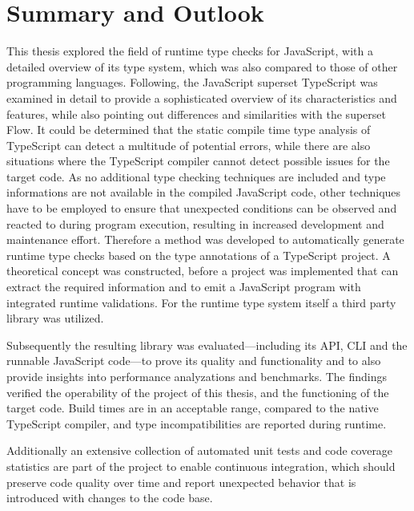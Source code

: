 \chapter{Summary and Outlook}
\label{cha:summary_outlook}

This thesis explored the field of runtime type checks for JavaScript, with a detailed overview of its type system, which was also compared to those of other programming languages. Following, the JavaScript superset TypeScript was examined in detail to provide a sophisticated overview of its characteristics and features, while also pointing out differences and similarities with the superset Flow. It could be determined that the static compile time type analysis of TypeScript can detect a multitude of potential errors, while there are also situations where the TypeScript compiler cannot detect possible issues for the target code. As no additional type checking techniques are included and type informations are not available in the compiled JavaScript code, other techniques have to be employed to ensure that unexpected conditions can be observed and reacted to during program execution, resulting in increased development and maintenance effort. Therefore a method was developed to automatically generate runtime type checks based on the type annotations of a TypeScript project. A theoretical concept was constructed, before a project was implemented that can extract the required information and to emit a JavaScript program with integrated runtime validations. For the runtime type system itself a third party library was utilized.

Subsequently the resulting library was evaluated---including its API, CLI and the runnable JavaScript code---to prove its quality and functionality and to also provide insights into performance analyzations and benchmarks. The findings verified the operability of the project of this thesis, and the functioning of the target code. Build times are in an acceptable range, compared to the native TypeScript compiler, and type incompatibilities are reported during runtime.

Additionally an extensive collection of automated unit tests and code coverage statistics are part of the project to enable continuous integration, which should preserve code quality over time and report unexpected behavior that is introduced with changes to the code base.


